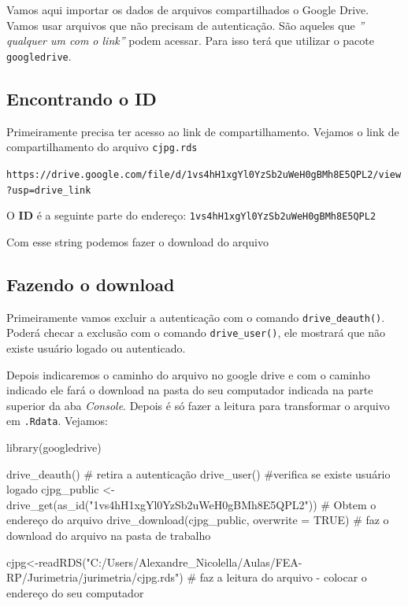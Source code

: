 \documentclass[
  letterpaper,
  DIV=11,
  numbers=noendperiod]{scrreprt}
\newenvironment{Shaded}{\begin{snugshade}}{\end{snugshade}}
\newcommand{\AttributeTok}[1]{\textcolor[rgb]{0.40,0.45,0.13}{#1}}
\newcommand{\CommentTok}[1]{\textcolor[rgb]{0.37,0.37,0.37}{#1}}
\newcommand{\ConstantTok}[1]{\textcolor[rgb]{0.56,0.35,0.01}{#1}}
\newcommand{\FunctionTok}[1]{\textcolor[rgb]{0.28,0.35,0.67}{#1}}
\newcommand{\NormalTok}[1]{\textcolor[rgb]{0.00,0.23,0.31}{#1}}
\newcommand{\OtherTok}[1]{\textcolor[rgb]{0.00,0.23,0.31}{#1}}
\newcommand{\StringTok}[1]{\textcolor[rgb]{0.13,0.47,0.30}{#1}}
\begin{document}
Vamos aqui importar os dados de arquivos compartilhados o Google Drive.
Vamos usar arquivos que não precisam de autenticação. São aqueles que
\emph{'' qualquer um com o link''} podem acessar. Para isso terá que
utilizar o pacote \texttt{googledrive}.

\subsection{Encontrando o ID}\label{encontrando-o-id}

Primeiramente precisa ter acesso ao link de compartilhamento. Vejamos o
link de compartilhamento do arquivo \texttt{cjpg.rds}

\texttt{https://drive.google.com/file/d/1vs4hH1xgYl0YzSb2uWeH0gBMh8E5QPL2/view?usp=drive\_link}

O \textbf{ID} é a seguinte parte do endereço:
\texttt{1vs4hH1xgYl0YzSb2uWeH0gBMh8E5QPL2}

Com esse string podemos fazer o download do arquivo

\subsection{Fazendo o download}\label{fazendo-o-download}

Primeiramente vamos excluir a autenticação com o comando
\texttt{drive\_deauth()}. Poderá checar a exclusão com o comando
\texttt{drive\_user()}, ele mostrará que não existe usuário logado ou
autenticado.

Depois indicaremos o caminho do arquivo no google drive e com o caminho
indicado ele fará o download na pasta do seu computador indicada na
parte superior da aba \emph{Console}. Depois é só fazer a leitura para
transformar o arquivo em \texttt{.Rdata}. Vejamos:

\begin{Shaded}
\begin{Highlighting}[]
\FunctionTok{library}\NormalTok{(googledrive)}

             
\FunctionTok{drive\_deauth}\NormalTok{()    }\CommentTok{\# retira a autenticação}
\FunctionTok{drive\_user}\NormalTok{()      }\CommentTok{\#verifica se existe usuário logado}
\NormalTok{cjpg\_public }\OtherTok{\textless{}{-}}  \FunctionTok{drive\_get}\NormalTok{(}\FunctionTok{as\_id}\NormalTok{(}\StringTok{"1vs4hH1xgYl0YzSb2uWeH0gBMh8E5QPL2"}\NormalTok{))   }\CommentTok{\# Obtem o endereço do arquivo}
\FunctionTok{drive\_download}\NormalTok{(cjpg\_public, }\AttributeTok{overwrite =} \ConstantTok{TRUE}\NormalTok{)    }\CommentTok{\# faz o download do arquivo na pasta de trabalho}


\NormalTok{cjpg}\OtherTok{\textless{}{-}}\FunctionTok{readRDS}\NormalTok{(}\StringTok{"C:/Users/Alexandre\_Nicolella/Aulas/FEA{-}RP/Jurimetria/jurimetria/cjpg.rds"}\NormalTok{)   }\CommentTok{\# faz a leitura do arquivo {-} colocar o endereço do seu computador}
\end{Highlighting}
\end{Shaded}
\end{document}
